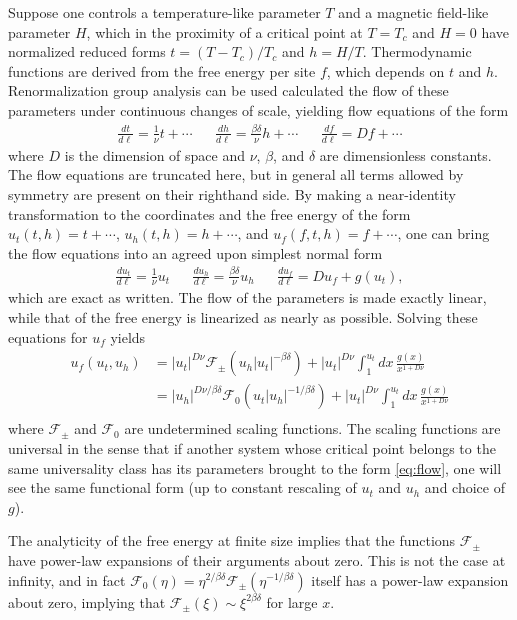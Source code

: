 \documentclass[
  aps,
  pre,
  reprint,
  longbibliography,
  floatfix
]{revtex4-2}
\begin{document}
Suppose one controls a temperature-like parameter $T$ and a magnetic field-like
parameter $H$, which in the proximity of a critical point at $T=T_c$ and $H=0$
have normalized reduced forms $t=(T-T_c)/T_c$ and $h=H/T$. Thermodynamic
functions are derived from the free energy per site $f$, which depends on $t$
and $h$. Renormalization group analysis can be used calculated the flow of
these parameters under continuous changes of scale, yielding flow equations of
the form
\begin{align} \label{eq:raw.flow}
  \frac{dt}{d\ell}=\frac1\nu t+\cdots
  &&
  \frac{dh}{d\ell}=\frac{\beta\delta}\nu h+\cdots
  &&
  \frac{df}{d\ell}=Df+\cdots
\end{align}
where $D$ is the dimension of space and $\nu$, $\beta$, and $\delta$ are
dimensionless constants. The flow equations are truncated here, but in general
all terms allowed by symmetry are present on their righthand side. By making a
near-identity transformation to the coordinates and the free energy of the form
$u_t(t, h)=t+\cdots$, $u_h(t, h)=h+\cdots$, and $u_f(f,t,h)=f+\cdots$, one can
bring the flow equations into an agreed upon simplest normal form
\begin{align} \label{eq:flow}
  \frac{du_t}{d\ell}=\frac1\nu u_t
  &&
  \frac{du_h}{d\ell}=\frac{\beta\delta}\nu u_h
  &&
  \frac{du_f}{d\ell}=Du_f+g(u_t),
\end{align}
which are exact as written. The flow of the parameters is made exactly linear,
while that of the free energy is linearized as nearly as possible. Solving these equations for $u_f$ yields
\begin{equation}
  \begin{aligned}
    u_f(u_t, u_h)
    &=|u_t|^{D\nu}\mathcal F_\pm(u_h|u_t|^{-\beta\delta})+|u_t|^{D\nu}\int_1^{u_t}dx\,\frac{g(x)}{x^{1+D\nu}} \\
    &=|u_h|^{D\nu/\beta\delta}\mathcal F_0(u_t|u_h|^{-1/\beta\delta})+|u_t|^{D\nu}\int_1^{u_t}dx\,\frac{g(x)}{x^{1+D\nu}} \\
  \end{aligned}
\end{equation}
where $\mathcal F_\pm$ and $\mathcal F_0$ are undetermined scaling functions.  The scaling functions are universal in the sense that if
another system whose critical point belongs to the same universality class has
its parameters brought to the form \eqref{eq:flow}, one will see the same
functional form (up to constant rescaling of $u_t$ and $u_h$ and choice of
$g$).

The analyticity of the free energy at finite size implies that the functions
$\mathcal F_\pm$ have power-law expansions of their arguments about zero. This
is not the case at infinity, and in fact $\mathcal
F_0(\eta)=\eta^{2/\beta\delta}\mathcal F_\pm(\eta^{-1/\beta\delta})$ itself has a power-law
expansion about zero, implying that $\mathcal F_\pm(\xi)\sim \xi^{2\beta\delta}$ for large $x$.
\end{document}
